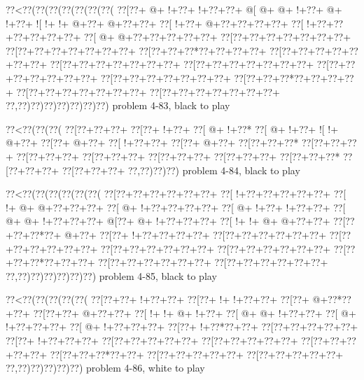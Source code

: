 \vbox{\vbox{\goo
\0??<\0??(\0??(\0??(\0??(\0??(\0??(\0??(
\0??[\0??+\- @+\- !+\0??+\- !+\0??+\0??+
\- @[\- @+\- @+\- !+\0??+\- @+\- !+\0??+
\- ![\- !+\- !+\- @+\0??+\- @+\0??+\0??+
\0??[\- !+\0??+\- @+\0??+\0??+\0??+\0??+
\0??[\- !+\0??+\0??+\0??+\0??+\0??+\0??+
\0??[\- @+\- @+\0??+\0??+\0??+\0??+\0??+
\0??[\0??+\0??+\0??+\0??+\0??+\0??+\0??+
\0??[\0??+\0??+\0??+\0??+\0??+\0??+\0??+
\0??[\0??+\0??+\0??*\0??+\0??+\0??+\0??+
\0??[\0??+\0??+\0??+\0??+\0??+\0??+\0??+
\0??[\0??+\0??+\0??+\0??+\0??+\0??+\0??+
\0??[\0??+\0??+\0??+\0??+\0??+\0??+\0??+
\0??[\0??+\0??+\0??+\0??+\0??+\0??+\0??+
\0??[\0??+\0??+\0??+\0??+\0??+\0??+\0??+
\0??[\0??+\0??+\0??*\0??+\0??+\0??+\0??+
\0??[\0??+\0??+\0??+\0??+\0??+\0??+\0??+
\0??[\0??+\0??+\0??+\0??+\0??+\0??+\0??+
\0??,\0??)\0??)\0??)\0??)\0??)\0??)\0??)
}
\hfil problem 4-83, black to play\hfil\break
}

\vbox{\vbox{\goo
\0??<\0??(\0??(\0??(
\0??[\0??+\0??+\0??+
\0??[\0??+\- !+\0??+
\0??[\- @+\- !+\0??*
\0??[\- @+\- !+\0??+
\- ![\- !+\- @+\0??+
\0??[\0??+\- @+\0??+
\0??[\- !+\0??+\0??+
\0??[\0??+\- @+\0??+
\0??[\0??+\0??+\0??*
\0??[\0??+\0??+\0??+
\0??[\0??+\0??+\0??+
\0??[\0??+\0??+\0??+
\0??[\0??+\0??+\0??+
\0??[\0??+\0??+\0??+
\0??[\0??+\0??+\0??*
\0??[\0??+\0??+\0??+
\0??[\0??+\0??+\0??+
\0??,\0??)\0??)\0??)
}
\hfil problem 4-84, black to play\hfil\break
}

\vbox{\vbox{\goo
\0??<\0??(\0??(\0??(\0??(\0??(\0??(
\0??[\0??+\0??+\0??+\0??+\0??+\0??+
\0??[\- !+\0??+\0??+\0??+\0??+\0??+
\0??[\- !+\- @+\- @+\0??+\0??+\0??+
\0??[\- @+\- !+\0??+\0??+\0??+\0??+
\0??[\- @+\- !+\0??+\- !+\0??+\0??+
\0??[\- @+\- @+\- !+\0??+\0??+\0??+
\- @[\0??+\- @+\- !+\0??+\0??+\0??+
\0??[\- !+\- !+\- @+\- @+\0??+\0??+
\0??[\0??+\0??+\0??*\0??+\- @+\0??+
\0??[\0??+\- !+\0??+\0??+\0??+\0??+
\0??[\0??+\0??+\0??+\0??+\0??+\0??+
\0??[\0??+\0??+\0??+\0??+\0??+\0??+
\0??[\0??+\0??+\0??+\0??+\0??+\0??+
\0??[\0??+\0??+\0??+\0??+\0??+\0??+
\0??[\0??+\0??+\0??*\0??+\0??+\0??+
\0??[\0??+\0??+\0??+\0??+\0??+\0??+
\0??[\0??+\0??+\0??+\0??+\0??+\0??+
\0??,\0??)\0??)\0??)\0??)\0??)\0??)
}
\hfil problem 4-85, black to play\hfil\break
}

\vbox{\vbox{\goo
\0??<\0??(\0??(\0??(\0??(\0??(
\0??[\0??+\0??+\- !+\0??+\0??+
\0??[\0??+\- !+\- !+\0??+\0??+
\0??[\0??+\- @+\0??*\0??+\0??+
\0??[\0??+\0??+\- @+\0??+\0??+
\0??[\- !+\- !+\- @+\- !+\0??+
\0??[\- @+\- @+\- !+\0??+\0??+
\0??[\- @+\- !+\0??+\0??+\0??+
\0??[\- @+\- !+\0??+\0??+\0??+
\0??[\0??+\- !+\0??*\0??+\0??+
\0??[\0??+\0??+\0??+\0??+\0??+
\0??[\0??+\- !+\0??+\0??+\0??+
\0??[\0??+\0??+\0??+\0??+\0??+
\0??[\0??+\0??+\0??+\0??+\0??+
\0??[\0??+\0??+\0??+\0??+\0??+
\0??[\0??+\0??+\0??*\0??+\0??+
\0??[\0??+\0??+\0??+\0??+\0??+
\0??[\0??+\0??+\0??+\0??+\0??+
\0??,\0??)\0??)\0??)\0??)\0??)
}
\hfil problem 4-86, white to play\hfil\break
}


